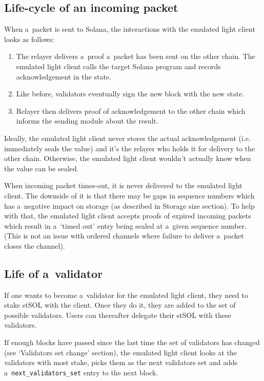 \documentclass[sigplan,screen,authorversion]{acmart}
\begin{document}
\subsection{Life-cycle of an incoming packet}

When a~packet is sent to Solana, the interactions with the emulated
light client looks as follows:
\begin{enumerate}
\item The relayer delivers a~proof a~packet has been sent on the other
  chain.  The emulated light client calls the target Solana program
  and records acknowledgement in the state.
\item Like before, validators eventually sign the new block with the
  new state.
\item Relayer then delivers proof of acknowledgement to the other
  chain which informs the sending module about the result.
\end{enumerate}

Ideally, the emulated light client never stores the actual
acknowledgement (i.e. immediately seals the value) and it’s the
relayer who holds it for delivery to the other chain.  Otherwise, the
emulated light client wouldn’t actually know when the value can be
sealed.

When incoming packet times-out, it is never delivered to the emulated
light client.  The downside of it is that there may be gaps in
sequence numbers which has a~negative impact on storage (as described
in Storage size section).  To help with that, the emulated light
client accepts proofs of expired incoming packets which result in
a~‘timed out’ entry being sealed at a~given sequence number.  (This is
not an issue with ordered channels where failure to deliver a~packet
closes the channel).

\subsection{Life of a~validator}

If one wants to become a~validator for the emulated light client, they
need to stake stSOL with the client.  Once they do it, they are added
to the set of possible validators. Users can thereafter delegate their
stSOL with these validators.

If enough blocks have passed since the last time the set of validators
has changed (see ‘Validators set change’ section), the emulated light
client looks at the validators with most stake, picks them as the next
validators set and adds a~\verb|next_validators_set| entry to the
next block.
\end{document}
